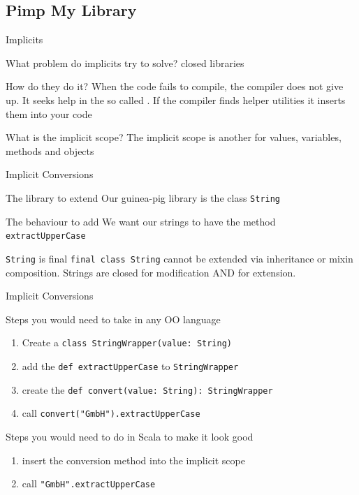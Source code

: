 \subsection{Pimp My Library}
\begin{frame}{Implicits}
\begin{block}{What problem do implicits try to solve?}
 \alert{closed} libraries
\end{block}
\begin{block}{How do they do it?}
When the code fails to compile, the compiler does not give up. It seeks help in
the so called . If the compiler finds helper utilities
it  inserts them into your code
\end{block}
\begin{block}{What is the implicit scope?}
The implicit scope is another  for values, variables,
methods and objects
\end{block}
\end{frame}

\begin{frame}[fragile]{Implicit Conversions}
\begin{block}{The library to extend}
Our guinea-pig library is the class \lstinline!String!
\end{block}
\begin{block}{The behaviour to add}
We want our strings to have the method \lstinline!extractUpperCase!
\end{block}
\begin{alertblock}{\lstinline!String! is final}
\lstinline!final class String! cannot be extended via inheritance or mixin
composition. Strings are closed for modification AND for extension.
\end{alertblock}
\end{frame}

\begin{frame}[fragile]{Implicit Conversions}
\begin{block}{Steps you would need to take in any OO language}
\begin{enumerate}
  \item Create a \lstinline!class StringWrapper(value: String)!
  \item add the \lstinline!def extractUpperCase! to \lstinline!StringWrapper!
  \item create the \lstinline!def convert(value: String): StringWrapper!
  \item call \lstinline!convert("GmbH").extractUpperCase!
\end{enumerate}
\end{block}
\begin{exampleblock}{Steps you would need to do in Scala to make it look good}
\begin{enumerate}
  \item insert the conversion method into the implicit scope
  \item call \lstinline!"GmbH".extractUpperCase!
\end{enumerate}
\end{exampleblock}
\end{frame}

